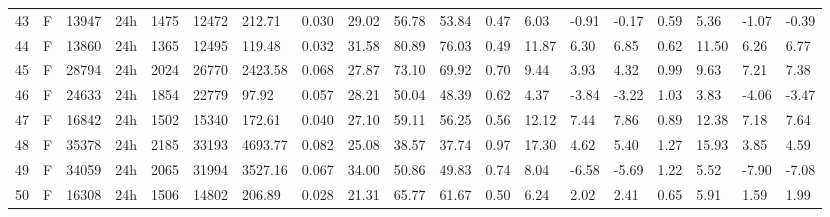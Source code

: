 \begin{tabular}{rllllllrlllllllllll}
43 & F & 13947 & 24h & 1475 & 12472 & 212.71 & 0.030 & 29.02 & 56.78 & 53.84 & 0.47 & 6.03 & -0.91 & -0.17 & 0.59 & 5.36 & -1.07 & -0.39 \\
44 & F & 13860 & 24h & 1365 & 12495 & 119.48 & 0.032 & 31.58 & 80.89 & 76.03 & 0.49 & 11.87 & 6.30 & 6.85 & 0.62 & 11.50 & 6.26 & 6.77 \\
45 & F & 28794 & 24h & 2024 & 26770 & 2423.58 & 0.068 & 27.87 & 73.10 & 69.92 & 0.70 & 9.44 & 3.93 & 4.32 & 0.99 & 9.63 & 7.21 & 7.38 \\
46 & F & 24633 & 24h & 1854 & 22779 & 97.92 & 0.057 & 28.21 & 50.04 & 48.39 & 0.62 & 4.37 & -3.84 & -3.22 & 1.03 & 3.83 & -4.06 & -3.47 \\
47 & F & 16842 & 24h & 1502 & 15340 & 172.61 & 0.040 & 27.10 & 59.11 & 56.25 & 0.56 & 12.12 & 7.44 & 7.86 & 0.89 & 12.38 & 7.18 & 7.64 \\
48 & F & 35378 & 24h & 2185 & 33193 & 4693.77 & 0.082 & 25.08 & 38.57 & 37.74 & 0.97 & 17.30 & 4.62 & 5.40 & 1.27 & 15.93 & 3.85 & 4.59 \\
49 & F & 34059 & 24h & 2065 & 31994 & 3527.16 & 0.067 & 34.00 & 50.86 & 49.83 & 0.74 & 8.04 & -6.58 & -5.69 & 1.22 & 5.52 & -7.90 & -7.08 \\
50 & F & 16308 & 24h & 1506 & 14802 & 206.89 & 0.028 & 21.31 & 65.77 & 61.67 & 0.50 & 6.24 & 2.02 & 2.41 & 0.65 & 5.91 & 1.59 & 1.99 \\
\bottomrule
\end{tabular}
